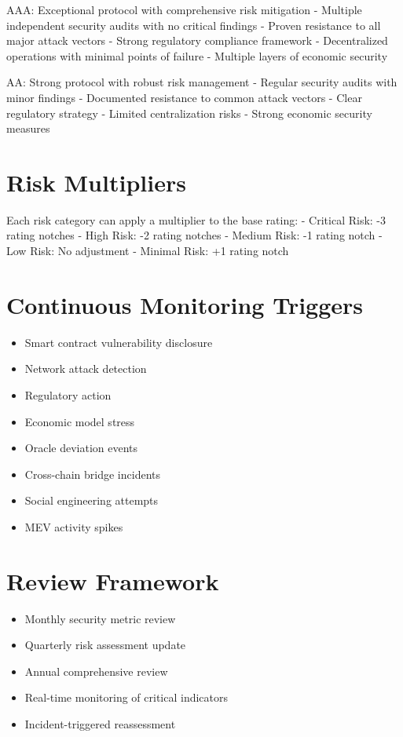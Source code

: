\documentclass[
  letterpaper,
  DIV=11,
  numbers=noendperiod]{scrreprt}
\providecommand{\tightlist}{%
  \setlength{\itemsep}{0pt}\setlength{\parskip}{0pt}}\usepackage{longtable,booktabs,array}
\begin{document}
AAA: Exceptional protocol with comprehensive risk mitigation - Multiple
independent security audits with no critical findings - Proven
resistance to all major attack vectors - Strong regulatory compliance
framework - Decentralized operations with minimal points of failure -
Multiple layers of economic security

AA: Strong protocol with robust risk management - Regular security
audits with minor findings - Documented resistance to common attack
vectors - Clear regulatory strategy - Limited centralization risks -
Strong economic security measures

\section{Risk Multipliers}\label{risk-multipliers}

Each risk category can apply a multiplier to the base rating: - Critical
Risk: -3 rating notches - High Risk: -2 rating notches - Medium Risk: -1
rating notch - Low Risk: No adjustment - Minimal Risk: +1 rating notch

\section{Continuous Monitoring
Triggers}\label{continuous-monitoring-triggers}

\begin{itemize}
\tightlist
\item
  Smart contract vulnerability disclosure
\item
  Network attack detection
\item
  Regulatory action
\item
  Economic model stress
\item
  Oracle deviation events
\item
  Cross-chain bridge incidents
\item
  Social engineering attempts
\item
  MEV activity spikes
\end{itemize}

\section{Review Framework}\label{review-framework}

\begin{itemize}
\tightlist
\item
  Monthly security metric review
\item
  Quarterly risk assessment update
\item
  Annual comprehensive review
\item
  Real-time monitoring of critical indicators
\item
  Incident-triggered reassessment
\end{itemize}
\end{document}
